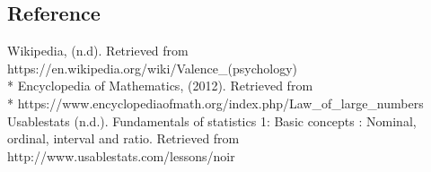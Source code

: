 \documentclass[10pt]{article}
\begin{document}
\subsection*{Reference}
Wikipedia, (n.d). Retrieved from https://en.wikipedia.org/wiki/Valence\_(psychology)\\*
Encyclopedia of Mathematics, (2012). Retrieved from\\* 
https://www.encyclopediaofmath.org/index.php/Law\_of\_large\_numbers
Usablestats (n.d.). Fundamentals of statistics 1: Basic concepts : Nominal, ordinal, interval and ratio. Retrieved from http://www.usablestats.com/lessons/noir
\end{document}
